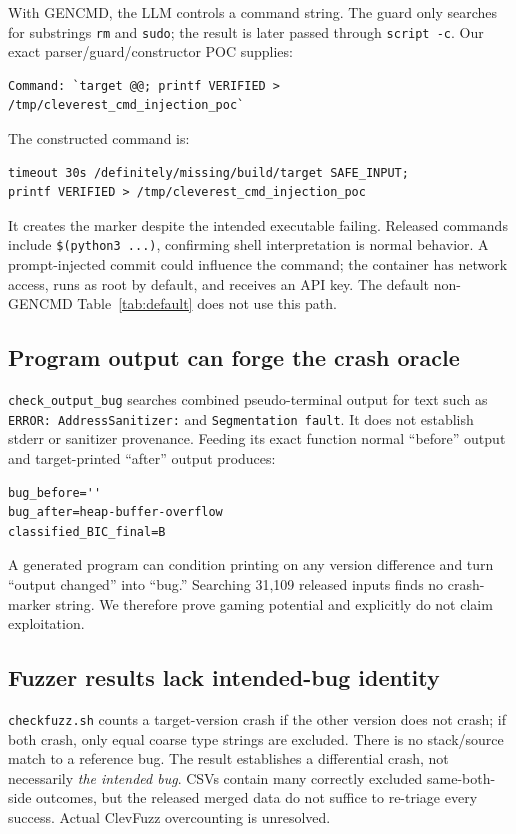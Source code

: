 \documentclass{article}
\begin{document}
With GENCMD, the LLM controls a command string.  The guard only searches for
substrings \texttt{rm} and \texttt{sudo}; the result is later passed through
\texttt{script -c}.  Our exact parser/guard/constructor POC supplies:
\begin{lstlisting}[style=auditcode,numbers=none]
Command: `target @@; printf VERIFIED > /tmp/cleverest_cmd_injection_poc`
\end{lstlisting}
The constructed command is:
\begin{lstlisting}[style=auditcode,numbers=none]
timeout 30s /definitely/missing/build/target SAFE_INPUT;
printf VERIFIED > /tmp/cleverest_cmd_injection_poc
\end{lstlisting}
It creates the marker despite the intended executable failing.  Released
commands include \texttt{\$(python3 ...)}, confirming shell interpretation is
normal behavior.  A prompt-injected commit could influence the command; the
container has network access, runs as root by default, and receives an API key.
The default non-GENCMD Table~\ref{tab:default} does not use this path.

\subsection{Program output can forge the crash oracle}

\texttt{check\_output\_bug} searches combined pseudo-terminal output for text
such as \texttt{ERROR: AddressSanitizer:} and \texttt{Segmentation fault}.  It
does not establish stderr or sanitizer provenance.  Feeding its exact function
normal ``before'' output and target-printed ``after'' output produces:
\begin{lstlisting}[style=auditcode,numbers=none]
bug_before=''
bug_after=heap-buffer-overflow
classified_BIC_final=B
\end{lstlisting}
A generated program can condition printing on any version difference and turn
``output changed'' into ``bug.''  Searching 31,109 released inputs finds no
crash-marker string.  We therefore prove gaming potential and explicitly do
not claim exploitation.

\subsection{Fuzzer results lack intended-bug identity}

\texttt{checkfuzz.sh} counts a target-version crash if the other version does
not crash; if both crash, only equal coarse type strings are excluded.  There
is no stack/source match to a reference bug.  The result establishes a
differential crash, not necessarily \emph{the intended bug}.  CSVs contain
many correctly excluded same-both-side outcomes, but the released merged data
do not suffice to re-triage every success.  Actual ClevFuzz overcounting is
unresolved.
\end{document}
